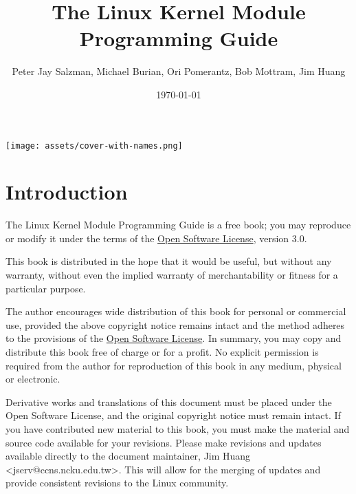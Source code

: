 \documentclass[10pt, oneside]{book}
\author{Peter Jay Salzman, Michael Burian, Ori Pomerantz, Bob Mottram, Jim Huang}
\date{\today}
\title{The Linux Kernel Module Programming Guide}
\begin{document}
\maketitle
\ifdefined\HCode
\texttt{[image: assets/cover-with-names.png]}
\else
\pagestyle{empty}
\tableofcontents
\fi

\section{Introduction}
\label{sec:introduction}
The Linux Kernel Module Programming Guide is a free book; you may reproduce or modify it under the terms of the \href{https://opensource.org/licenses/OSL-3.0}{Open Software License}, version 3.0.

This book is distributed in the hope that it would be useful, but without any warranty, without even the implied warranty of merchantability or fitness for a particular purpose.

The author encourages wide distribution of this book for personal or commercial use, provided the above copyright notice remains intact and the method adheres to the provisions of the \href{https://opensource.org/licenses/OSL-3.0}{Open Software License}.
In summary, you may copy and distribute this book free of charge or for a profit. No explicit permission is required from the author for reproduction of this book in any medium, physical or electronic.

Derivative works and translations of this document must be placed under the Open Software License, and the original copyright notice must remain intact.
If you have contributed new material to this book, you must make the material and source code available for your revisions.
Please make revisions and updates available directly to the document maintainer, Jim Huang <jserv@ccns.ncku.edu.tw>.
This will allow for the merging of updates and provide consistent revisions to the Linux community.
\end{document}
